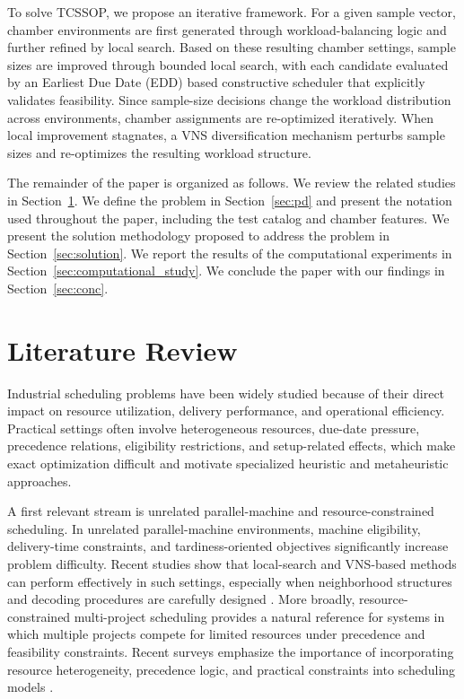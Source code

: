 \documentclass[11pt]{article}
\begin{document}
To solve TCSSOP, we propose an iterative framework. For a given sample vector, chamber environments are first generated through workload-balancing logic and further refined by local search. Based on these resulting chamber settings, sample sizes are improved through bounded local search, with each candidate evaluated by an Earliest Due Date (EDD) based constructive scheduler that explicitly validates feasibility. Since sample-size decisions change the workload distribution across environments, chamber assignments are re-optimized iteratively. When local improvement stagnates, a VNS diversification mechanism perturbs sample sizes and re-optimizes the resulting workload structure.

The remainder of the paper is organized as follows. We review the related studies in Section~\ref{sec:literature_review}. We define the problem in Section~\ref{sec:pd} and present the notation used throughout the paper, including the test catalog and chamber features. We present the solution methodology proposed to address the problem in Section~\ref{sec:solution}. We report the results of the computational experiments in Section~\ref{sec:computational_study}. We conclude the paper with our findings in Section~\ref{sec:conc}.
\section{Literature Review}
\label{sec:literature_review}

Industrial scheduling problems have been widely studied because of their direct impact on resource utilization, delivery performance, and operational efficiency. Practical settings often involve heterogeneous resources, due-date pressure, precedence relations, eligibility restrictions, and setup-related effects, which make exact optimization difficult and motivate specialized heuristic and metaheuristic approaches.

A first relevant stream is unrelated parallel-machine and resource-constrained scheduling. In unrelated parallel-machine environments, machine eligibility, delivery-time constraints, and tardiness-oriented objectives significantly increase problem difficulty. Recent studies show that local-search and VNS-based methods can perform effectively in such settings, especially when neighborhood structures and decoding procedures are carefully designed \citep{UlagaDurasevicJakobovic2022,MaeckerShenMonch2023}. More broadly, resource-constrained multi-project scheduling provides a natural reference for systems in which multiple projects compete for limited resources under precedence and feasibility constraints. Recent surveys emphasize the importance of incorporating resource heterogeneity, precedence logic, and practical constraints into scheduling models \citep{HartmannBriskorn2022,GomezSanchezLallaRuizFernandezGilCastroVoss2023}.
\end{document}
